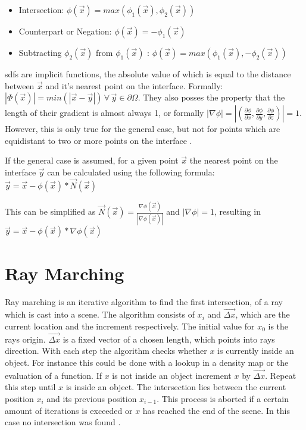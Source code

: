 \begin{itemize}
	\item Intersection:  $\phi(\vec{x}) = max(\phi_1(\vec{x}), \phi_2(\vec{x}))$
	\item Counterpart or Negation: $\phi(\vec{x}) = -\phi_1(\vec{x})$ 
	\item Subtracting $\phi_2(\vec{x})$ from $\phi_1(\vec{x})$ :  $\phi(\vec{x}) = max(\phi_1(\vec{x}), -\phi_2(\vec{x}))$
\end{itemize}


\Glspl{sdf} are implicit functions, the absolute value of which is equal to the distance between $\vec{x}$ and it's nearest point on the interface. Formally:  $|\Phi(\vec{x})| = min(|\vec{x} - \vec{y}|) \, \forall \, \vec{y} \in \partial\Omega$. They also posses the property that the length of their gradient is almost always 1, or formally  $|\nabla\phi| = |(\frac{\partial\phi}{\partial x},\frac{\partial\phi}{\partial y},\frac{\partial\phi}{\partial z})| = 1$. However, this is only true for the general case, but not for points which are equidistant to two or more points on the interface \cite{osher:2006:level}.

If the general case is assumed, for a given point $\vec{x}$ the nearest point on the interface $\vec{y}$ can be calculated using the following formula: $\vec{y} = \vec{x} - \phi(\vec{x}) * \vec{N}(\vec{x}) $

This can be simplified as  $\vec{N}(\vec{x}) = \frac{\nabla\phi(\vec{x})}{|\nabla\phi(\vec{x})|}$ and $|\nabla\phi| = 1$, resulting in 
$\vec{y} = \vec{x} - \phi(\vec{x}) * \nabla\phi(\vec{x}) $ \cite{osher:2006:level}


\section{Ray Marching}
Ray marching is an iterative algorithm to find the first intersection, of a ray which is cast into a scene. The algorithm consists of $x_i$ and $\vec{ \Delta x}$, which are the current location and the increment respectively. The initial value for $x_0$ is the rays origin. $\vec{ \Delta x}$ is a fixed vector of a chosen length, which points into rays direction. With each step the algorithm checks whether $x$ is currently inside an object. For instance this could be done with a lookup in a density map or the evaluation of a function. If $x$ is not inside an object increment $x$ by $\vec{ \Delta x}$. Repeat this step until $x$ is inside an object. The intersection lies between the current position  $x_i$ and its previous position  $x_{i-1}$. This process is aborted if a certain amount of iterations is exceeded or $x$ has reached the end of the scene. In this case no intersection was found \cite{tuy:1984:direct} \cite{perlin:1989:hypertexture}.

